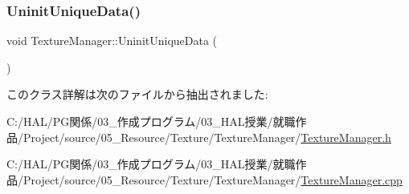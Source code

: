 \subsubsection{\texorpdfstring{Uninit\+Unique\+Data()}{UninitUniqueData()}}
{\footnotesize\ttfamily void Texture\+Manager\+::\+Uninit\+Unique\+Data (\begin{DoxyParamCaption}{ }\end{DoxyParamCaption})\hspace{0.3cm}{\ttfamily [static]}}



このクラス詳解は次のファイルから抽出されました\+:\begin{DoxyCompactItemize}
\item 
C\+:/\+H\+A\+L/\+P\+G関係/03\+\_\+作成プログラム/03\+\_\+\+H\+A\+L授業/就職作品/\+Project/source/05\+\_\+\+Resource/\+Texture/\+Texture\+Manager/\mbox{\hyperlink{_texture_manager_8h}{Texture\+Manager.\+h}}\item 
C\+:/\+H\+A\+L/\+P\+G関係/03\+\_\+作成プログラム/03\+\_\+\+H\+A\+L授業/就職作品/\+Project/source/05\+\_\+\+Resource/\+Texture/\+Texture\+Manager/\mbox{\hyperlink{_texture_manager_8cpp}{Texture\+Manager.\+cpp}}\end{DoxyCompactItemize}
